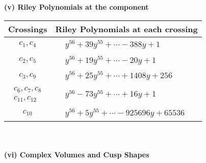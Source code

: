 \documentclass[1p]{elsarticle_modified}
\theoremstyle{definition}
\begin{document}
\newpage\renewcommand{\arraystretch}{1}
\flushleft \textbf{(v) Riley Polynomials at the component}\newline \\
\begin{tabular}{m{50pt}|m{274pt}}
Crossings & \hspace{64pt}Riley Polynomials at each crossing \\
\hline $$\begin{aligned}c_{1},c_{4}\end{aligned}$$&$\begin{aligned}
&y^{56}+39 y^{55}+\cdots-388 y+1
\end{aligned}$\\
\hline $$\begin{aligned}c_{2},c_{5}\end{aligned}$$&$\begin{aligned}
&y^{56}+19 y^{55}+\cdots-20 y+1
\end{aligned}$\\
\hline $$\begin{aligned}c_{3},c_{9}\end{aligned}$$&$\begin{aligned}
&y^{56}+25 y^{55}+\cdots+1408 y+256
\end{aligned}$\\
\hline $$\begin{aligned}c_{6},c_{7},c_{8}\\c_{11},c_{12}\end{aligned}$$&$\begin{aligned}
&y^{56}-73 y^{55}+\cdots+16 y+1
\end{aligned}$\\
\hline $$\begin{aligned}c_{10}\end{aligned}$$&$\begin{aligned}
&y^{56}+5 y^{55}+\cdots-925696 y+65536
\end{aligned}$\\
\hline
\end{tabular}\\~\\
\newpage\flushleft \textbf{(vi) Complex Volumes and Cusp Shapes}
\end{document}
